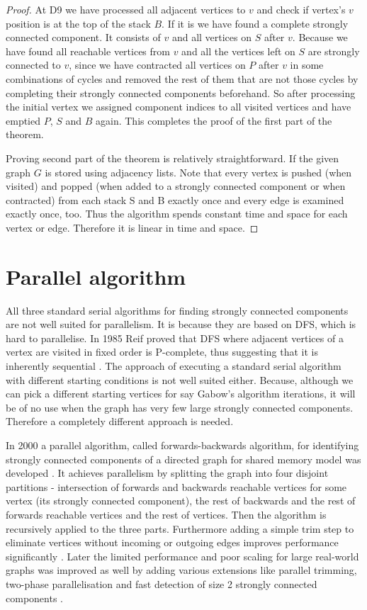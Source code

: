 \documentclass{report}
\theoremstyle{plain}
\theoremstyle{definition}
\theoremstyle{remark}
\numberwithin{definition}{chapter}
\numberwithin{example}{chapter}
\numberwithin{figure}{chapter}
\numberwithin{theorem}{chapter}
\numberwithin{lemma}{chapter}
\begin{document}
\begin{proof}
At D9 we have processed all adjacent vertices to $v$ and check if vertex's $v$ position is at the top of the stack $B$. If it is we have found a complete strongly connected component. It consists of $v$ and all vertices on $S$ after $v$. Because we have found all reachable vertices from $v$ and all the vertices left on $S$ are strongly connected to $v$, since we have contracted all vertices on $P$ after $v$ in some combinations of cycles and removed the rest of them that are not those cycles by completing their strongly connected components beforehand. So after processing the initial vertex we assigned component indices to all visited vertices and have emptied $P$, $S$ and $B$ again. This completes the proof  of the first part of the theorem.

Proving second part of the theorem is relatively straightforward. If the given graph $G$ is stored using adjacency lists. Note that every vertex is pushed (when visited) and popped (when added to a strongly connected component or when contracted) from each stack S and B exactly once and every edge is examined exactly once, too. Thus the algorithm spends constant time and space for each vertex or edge. Therefore it is linear in time and space.
\end{proof}

\section{Parallel algorithm}

All three standard serial algorithms for finding strongly connected components are not well suited for parallelism. It is because they are based on DFS, which is hard to parallelise. In 1985 Reif proved that DFS where adjacent vertices of a vertex are visited in fixed order is P-complete, thus suggesting that it is inherently sequential \cite{reif1985depth}. The approach of executing a standard serial algorithm with different starting conditions is not well suited either. Because, although we can pick a different starting vertices for say Gabow's algorithm iterations, it will be of no use when the graph has very few large strongly connected components. Therefore a completely different approach is needed.

In 2000 a parallel algorithm, called forwards-backwards algorithm, for identifying strongly connected components of a directed graph for shared memory model was developed \cite{fleischer2000identifying}. It achieves parallelism by splitting the graph into four disjoint partitions - intersection of forwards and backwards reachable vertices for some vertex (its strongly connected component), the rest of backwards and the rest of forwards reachable vertices and the rest of vertices. Then the algorithm is recursively applied to the three parts. Furthermore adding a simple trim step to eliminate vertices without incoming or outgoing edges improves performance significantly \cite{mclendon2005finding}. Later the limited performance and poor scaling for large real-world graphs was improved as well by adding various extensions like parallel trimming, two-phase parallelisation and fast detection of size 2 strongly connected components \cite{hongtechnical}.
\end{document}
